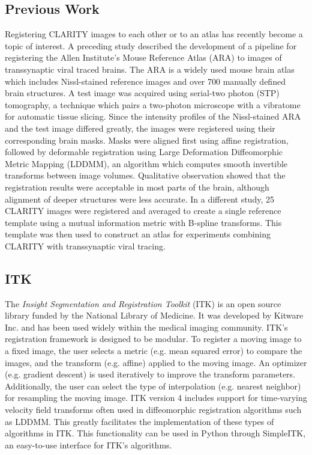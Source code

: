 \documentclass[]{spie}  %
\begin{document}
\subsection{Previous Work}
Registering CLARITY images to each other or to an atlas has recently become a topic of interest.
A preceding study described the development of a pipeline for registering the Allen Institute's Mouse Reference Atlas (ARA) to images of transsynaptic viral traced brains. \cite{Kutten}
The ARA is a widely used mouse brain atlas which includes Nissl-stained reference images and over 700 manually defined brain structures.\cite{ABAWhitePaper}
A test image was acquired using serial-two photon (STP) tomography, a technique which pairs a two-photon microscope with a vibratome for automatic tissue slicing. \cite{Ragan}
Since the intensity profiles of the Nissl-stained ARA and the test image differed greatly, the images were registered using their corresponding brain masks.
Masks were aligned first using affine registration, followed by deformable registration using Large Deformation Diffeomorphic Metric Mapping (LDDMM), an algorithm which computes smooth invertible transforms between image volumes. %
Qualitative observation showed that the registration results were acceptable in most parts of the brain, although alignment of deeper structures were less accurate.\cite{Kutten}
In a different study, 25 CLARITY images were registered and averaged to create a single reference template using a mutual information metric with B-spline transforms.  This template was then used to construct an atlas for experiments combining CLARITY with transsynaptic viral tracing. \cite{Menegas}

\subsection{ITK}
The \emph{Insight Segmentation and Registration Toolkit} (ITK) is an open source library funded by the National Library of Medicine.
It was developed by Kitware Inc. and has been used widely within the medical imaging community. \cite{ITK1}
ITK's registration framework is designed to be modular.  To register a moving image to a fixed image, the user selects a metric (e.g. mean squared error) to compare the images, and the transform (e.g. affine) applied to the moving image. An optimizer (e.g. gradient descent) is used iteratively to improve the transform parameters.
Additionally, the user can select the type of interpolation (e.g. nearest neighbor) for resampling the moving image. \cite{ITK2}
ITK version 4 includes support for time-varying velocity field transforms often used in diffeomorphic registration algorithms such as LDDMM.
This greatly facilitates the implementation of these types of algorithms in ITK. \cite{Avants12}
This functionality can be used in Python through SimpleITK, an easy-to-use interface for ITK's algorithms. \cite{Lowekamp}
\end{document}
